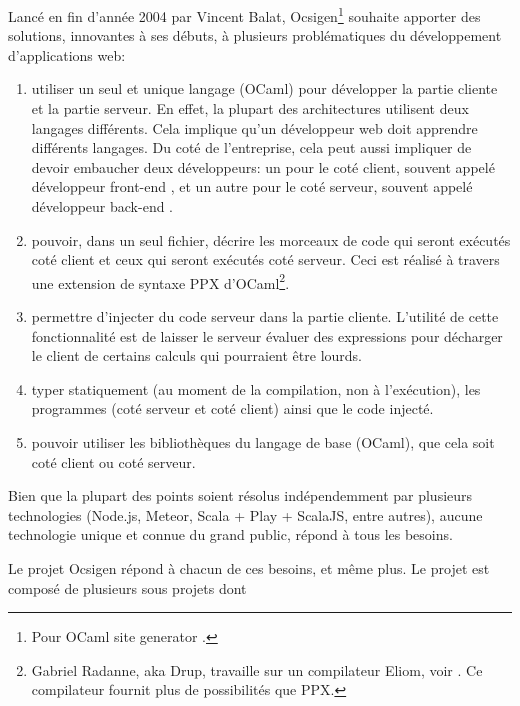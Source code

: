 Lancé en fin d'année 2004 par Vincent Balat, Ocsigen\footnote{Pour \og OCaml site
  generator \fg.} souhaite apporter des solutions, innovantes à ses débuts, à
plusieurs problématiques du développement d'applications web:

\begin{enumerate}
  \item utiliser un seul et unique langage (OCaml) pour développer la partie cliente et
    la partie serveur. En effet, la plupart des architectures utilisent deux
    langages différents. Cela implique qu'un développeur web doit apprendre différents
    langages. Du coté de l'entreprise, cela peut aussi impliquer de devoir
    embaucher deux développeurs: un pour le coté client, souvent appelé
    \og développeur front-end \fg, et un autre pour le coté serveur, souvent appelé
    \og développeur back-end \fg.
  \item pouvoir, dans un seul fichier, décrire les morceaux de code qui seront
exécutés coté client et ceux qui seront exécutés coté serveur. Ceci est réalisé
à travers une extension de syntaxe PPX d'OCaml\footnote{Gabriel Radanne, aka
  Drup, travaille sur un compilateur Eliom, voir
  \cite{ocsigen-eliomlang-github}. Ce compilateur fournit plus de possibilités
  que PPX.}.
  \item permettre d'injecter du code serveur dans la partie cliente.
    L'utilité de cette fonctionnalité est de laisser le serveur évaluer
des expressions pour décharger le client de certains calculs qui pourraient être
lourds.
  \item typer statiquement (au moment de la compilation, non à l'exécution), les
    programmes (coté serveur et coté client) ainsi que le code injecté.
  \item pouvoir utiliser les bibliothèques du langage de base (OCaml), que cela
    soit coté client ou coté serveur.
\end{enumerate}

Bien que la plupart des points soient résolus indépendemment par plusieurs
technologies (Node.js\cite{nodejs-website}, Meteor\cite{meteor-website},
Scala\cite{scala-website} + Play\cite{play-website} +
ScalaJS\cite{scalajs-website}, entre autres), aucune technologie unique et
connue du grand public, répond à tous les besoins.

Le projet Ocsigen répond à chacun de ces besoins, et même plus. Le projet est
composé de plusieurs sous projets dont

